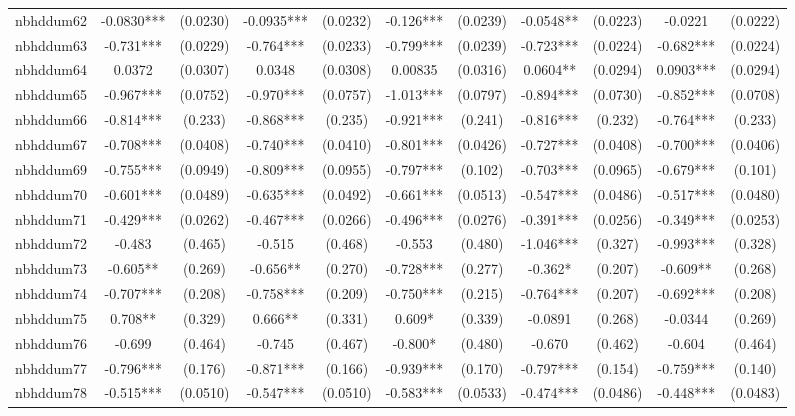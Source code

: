 \documentclass[]{article}
\begin{document}
\begin{tabular}{lcccccccccc}
nbhddum62 & -0.0830*** & (0.0230) & -0.0935*** & (0.0232) & -0.126*** & (0.0239) & -0.0548** & (0.0223) & -0.0221 & (0.0222) \\
nbhddum63 & -0.731*** & (0.0229) & -0.764*** & (0.0233) & -0.799*** & (0.0239) & -0.723*** & (0.0224) & -0.682*** & (0.0224) \\
nbhddum64 & 0.0372 & (0.0307) & 0.0348 & (0.0308) & 0.00835 & (0.0316) & 0.0604** & (0.0294) & 0.0903*** & (0.0294) \\
nbhddum65 & -0.967*** & (0.0752) & -0.970*** & (0.0757) & -1.013*** & (0.0797) & -0.894*** & (0.0730) & -0.852*** & (0.0708) \\
nbhddum66 & -0.814*** & (0.233) & -0.868*** & (0.235) & -0.921*** & (0.241) & -0.816*** & (0.232) & -0.764*** & (0.233) \\
nbhddum67 & -0.708*** & (0.0408) & -0.740*** & (0.0410) & -0.801*** & (0.0426) & -0.727*** & (0.0408) & -0.700*** & (0.0406) \\
nbhddum69 & -0.755*** & (0.0949) & -0.809*** & (0.0955) & -0.797*** & (0.102) & -0.703*** & (0.0965) & -0.679*** & (0.101) \\
nbhddum70 & -0.601*** & (0.0489) & -0.635*** & (0.0492) & -0.661*** & (0.0513) & -0.547*** & (0.0486) & -0.517*** & (0.0480) \\
nbhddum71 & -0.429*** & (0.0262) & -0.467*** & (0.0266) & -0.496*** & (0.0276) & -0.391*** & (0.0256) & -0.349*** & (0.0253) \\
nbhddum72 & -0.483 & (0.465) & -0.515 & (0.468) & -0.553 & (0.480) & -1.046*** & (0.327) & -0.993*** & (0.328) \\
nbhddum73 & -0.605** & (0.269) & -0.656** & (0.270) & -0.728*** & (0.277) & -0.362* & (0.207) & -0.609** & (0.268) \\
nbhddum74 & -0.707*** & (0.208) & -0.758*** & (0.209) & -0.750*** & (0.215) & -0.764*** & (0.207) & -0.692*** & (0.208) \\
nbhddum75 & 0.708** & (0.329) & 0.666** & (0.331) & 0.609* & (0.339) & -0.0891 & (0.268) & -0.0344 & (0.269) \\
nbhddum76 & -0.699 & (0.464) & -0.745 & (0.467) & -0.800* & (0.480) & -0.670 & (0.462) & -0.604 & (0.464) \\
nbhddum77 & -0.796*** & (0.176) & -0.871*** & (0.166) & -0.939*** & (0.170) & -0.797*** & (0.154) & -0.759*** & (0.140) \\
nbhddum78 & -0.515*** & (0.0510) & -0.547*** & (0.0510) & -0.583*** & (0.0533) & -0.474*** & (0.0486) & -0.448*** & (0.0483) \\

\end{tabular}
\end{document}
